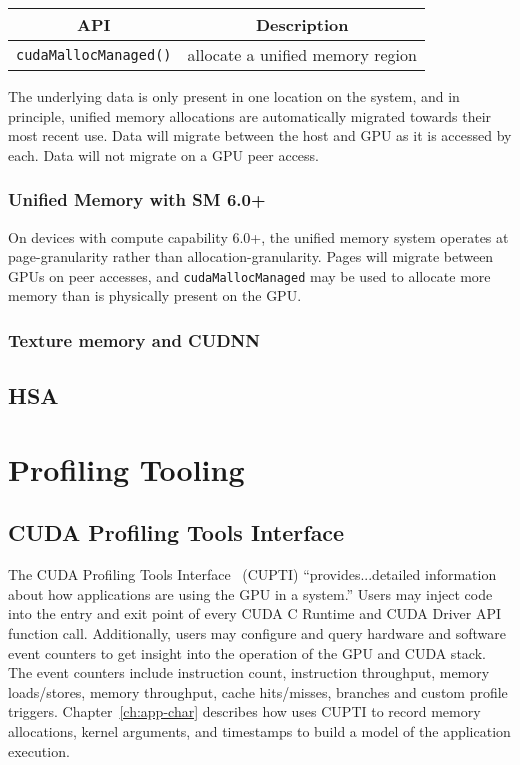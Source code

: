 \begin{table}[h]
    \centering
    \caption[CUDA Unified Memory-Management APIs]{}
    \label{tab:cuda-um-apis}
    \begin{tabular}{|c|c|}
    \hline
    \textbf{API}                & \textbf{Description} \\ \hline
    \texttt{cudaMallocManaged()}   & allocate a unified memory region \\ \hline
    \end{tabular}
\end{table}

The underlying data is only present in one location on the system, and in principle, unified memory allocations are automatically migrated towards their most recent use.
Data will migrate between the host and GPU as it is accessed by each.
Data will not migrate on a GPU peer access.

\subsubsection{Unified Memory with SM 6.0+}

On devices with compute capability 6.0+, the unified memory system operates at page-granularity rather than allocation-granularity.
Pages will migrate between GPUs on peer accesses, and \texttt{cudaMallocManaged} may be used to allocate more memory than is physically present on the GPU.


\subsubsection{Texture memory and CUDNN}

\subsection{HSA}
\label{sec:hsa}


\section{Profiling Tooling}

\subsection{CUDA Profiling Tools Interface}
\label{sec:cupti}

The CUDA Profiling Tools Interface~\cite{nvidia2017cupti} (CUPTI) ``provides...detailed information about how applications are using the GPU in a system.''
Users may inject code into the entry and exit point of every CUDA C Runtime and CUDA Driver API function call.
Additionally, users may configure and query hardware and software event counters to get insight into the operation of the GPU and CUDA stack.
The event counters include instruction count, instruction throughput, memory loads/stores, memory throughput, cache hits/misses, branches and custom profile triggers.
Chapter~\ref{ch:app-char} describes how  uses CUPTI to record memory allocations, kernel arguments, and timestamps to build a model of the application execution.

